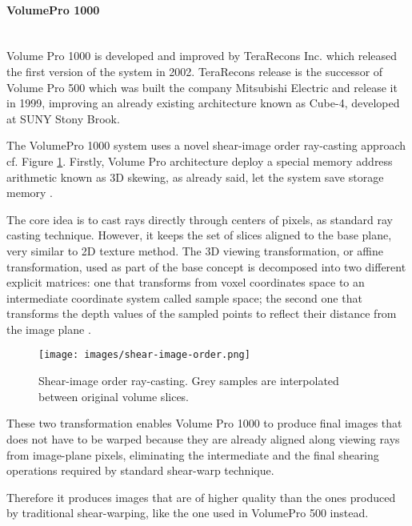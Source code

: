\documentclass[12pt,a4paper]{extarticle}
\newcommand{\linespace}{\vspace{0pt}}
\newcommand{\myparagraph}[1]{\paragraph{#1}\mbox{}\\}
\begin{document}
\myparagraph{VolumePro 1000} Volume Pro 1000 is developed and improved by TeraRecons Inc. which released the first version of the system in 2002. TeraRecons release is the successor of Volume Pro 500 which was built  the company Mitsubishi Electric and release it in 1999, improving an already existing architecture known as Cube-4, developed at SUNY Stony Brook.
\linespace

The VolumePro 1000 system \cite {Wu:2003:SOR:641480.641510}
uses a novel shear-image order ray-casting approach cf. Figure \ref{fig:shearimageorder}.
 Firstly, Volume Pro architecture deploy a special memory address arithmetic known as 3D skewing, as already said, let the system save storage memory \cite{PFISTER2005229}. 
\linespace

The core idea is to cast rays directly through centers of pixels, as standard ray casting technique. However, it keeps the set of slices aligned to the base plane, very similar to 2D texture method. The 3D viewing transformation, or affine transformation, used as part of the base concept is decomposed into two different explicit matrices: one that transforms from voxel coordinates space to an intermediate coordinate system called sample space; the second one that transforms the depth values of the sampled points to reflect their distance from the image plane \cite{PFISTER2005229}.

\begin{figure}[hbtp]
\centering
\texttt{[image: images/shear-image-order.png]}
\caption{Shear-image order ray-casting. Grey samples are interpolated between original volume slices.}
\label{fig:shearimageorder}
\end{figure}


These two transformation enables Volume Pro 1000 to produce final images that does not have to be warped because they are already aligned along viewing rays from image-plane pixels, eliminating the intermediate and the final shearing operations required by standard shear-warp technique. 

Therefore it produces images that are of higher quality than the ones produced by traditional shear-warping, like the one used in VolumePro 500 instead. %
\linespace
\end{document}
